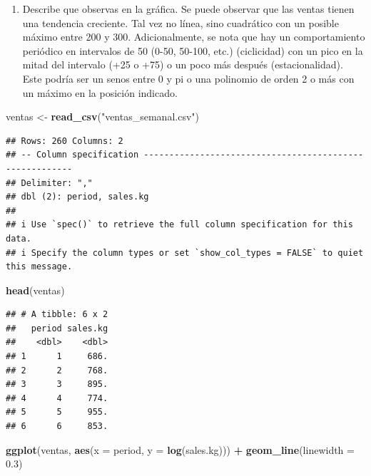 \documentclass[
]{article}
\newenvironment{Shaded}{\begin{snugshade}}{\end{snugshade}}
\newcommand{\AttributeTok}[1]{\textcolor[rgb]{0.13,0.29,0.53}{#1}}
\newcommand{\FloatTok}[1]{\textcolor[rgb]{0.00,0.00,0.81}{#1}}
\newcommand{\FunctionTok}[1]{\textcolor[rgb]{0.13,0.29,0.53}{\textbf{#1}}}
\newcommand{\NormalTok}[1]{#1}
\newcommand{\OtherTok}[1]{\textcolor[rgb]{0.56,0.35,0.01}{#1}}
\newcommand{\SpecialCharTok}[1]{\textcolor[rgb]{0.81,0.36,0.00}{\textbf{#1}}}
\newcommand{\StringTok}[1]{\textcolor[rgb]{0.31,0.60,0.02}{#1}}
\providecommand{\tightlist}{%
  \setlength{\itemsep}{0pt}\setlength{\parskip}{0pt}}
\begin{document}
\begin{enumerate}
\def\labelenumi{\arabic{enumi}.}
\tightlist
\item
  Describe que observas en la gráfica. Se puede observar que las ventas
  tienen una tendencia creciente. Tal vez no línea, sino cuadrático con
  un posible máximo entre 200 y 300. Adicionalmente, se nota que hay un
  comportamiento periódico en intervalos de 50 (0-50, 50-100, etc.)
  (ciclicidad) con un pico en la mitad del intervalo (+25 o +75) o un
  poco más después (estacionalidad). Este podría ser un senos entre 0 y
  pi o una polinomio de orden 2 o más con un máximo en la posición
  indicado.
\end{enumerate}

\begin{Shaded}
\begin{Highlighting}[]
\NormalTok{ventas }\OtherTok{\textless{}{-}} \FunctionTok{read\_csv}\NormalTok{(}\StringTok{"ventas\_semanal.csv"}\NormalTok{)}
\end{Highlighting}
\end{Shaded}

\begin{verbatim}
## Rows: 260 Columns: 2
## -- Column specification --------------------------------------------------------
## Delimiter: ","
## dbl (2): period, sales.kg
## 
## i Use `spec()` to retrieve the full column specification for this data.
## i Specify the column types or set `show_col_types = FALSE` to quiet this message.
\end{verbatim}

\begin{Shaded}
\begin{Highlighting}[]
\FunctionTok{head}\NormalTok{(ventas)}
\end{Highlighting}
\end{Shaded}

\begin{verbatim}
## # A tibble: 6 x 2
##   period sales.kg
##    <dbl>    <dbl>
## 1      1     686.
## 2      2     768.
## 3      3     895.
## 4      4     774.
## 5      5     955.
## 6      6     853.
\end{verbatim}

\begin{Shaded}
\begin{Highlighting}[]
\FunctionTok{ggplot}\NormalTok{(ventas, }\FunctionTok{aes}\NormalTok{(}\AttributeTok{x =}\NormalTok{ period, }\AttributeTok{y =} \FunctionTok{log}\NormalTok{(sales.kg))) }\SpecialCharTok{+} 
  \FunctionTok{geom\_line}\NormalTok{(}\AttributeTok{linewidth =} \FloatTok{0.3}\NormalTok{)}
\end{Highlighting}
\end{Shaded}
\end{document}

